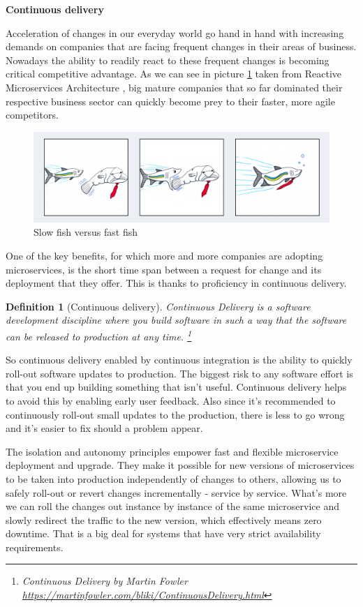 \documentclass[12pt,oneside]{fithesis2}
\newtheorem{definition}{Definition}
\begin{document}
\noindent\textbf{Continuous delivery}
\bigskip

Acceleration of changes in our everyday world go hand in hand with increasing demands on companies that are facing frequent changes in their areas of business. Nowadays the ability to readily react to these frequent changes is becoming critical competitive advantage. As we can see in picture \ref{fast_fish} taken from Reactive Microservices Architecture \cite{rma}, big mature companies that so far dominated their respective business sector can quickly become prey to their faster, more agile competitors.

\begin{figure}[ht!]
	\label{fast_fish}
	\centering
	\includegraphics[width=\textwidth]{images/fast_fish.png}
	\caption{Slow fish versus fast fish \cite{rma}}
\end{figure}

One of the key benefits, for which more and more companies are adopting microservices, is the short time span between a request for change and its deployment that they offer. This is thanks to proficiency in continuous delivery.

\begin{definition}[Continuous delivery]
Continuous Delivery is a software development discipline where you build software in such a way that the software can be released to production at any time. \footnote{Continuous Delivery by Martin Fowler \url{https://martinfowler.com/bliki/ContinuousDelivery.html}}
\end{definition}

So continuous delivery enabled by continuous integration is the ability to quickly roll-out software updates to production. The biggest risk to any software effort is that you end up building something that isn't useful. Continuous delivery helps to avoid this by enabling early user feedback. Also since it's recommended to continuously roll-out small updates to the production, there is less to go wrong and it's easier to fix should a problem appear.

The isolation and autonomy principles empower fast and flexible microservice deployment and upgrade. They make it possible for new versions of microservices to be taken into production independently of changes to others, allowing us to safely roll-out or revert changes incrementally - service by service. What's more we can roll the changes out instance by instance of the same microservice and slowly redirect the traffic to the new version, which effectively means zero downtime. That is a big deal for systems that have very strict availability requirements.
\end{document}
